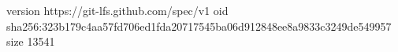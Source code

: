 version https://git-lfs.github.com/spec/v1
oid sha256:323b179c4aa57fd706ed1fda20717545ba06d912848ee8a9833c3249de549957
size 13541
